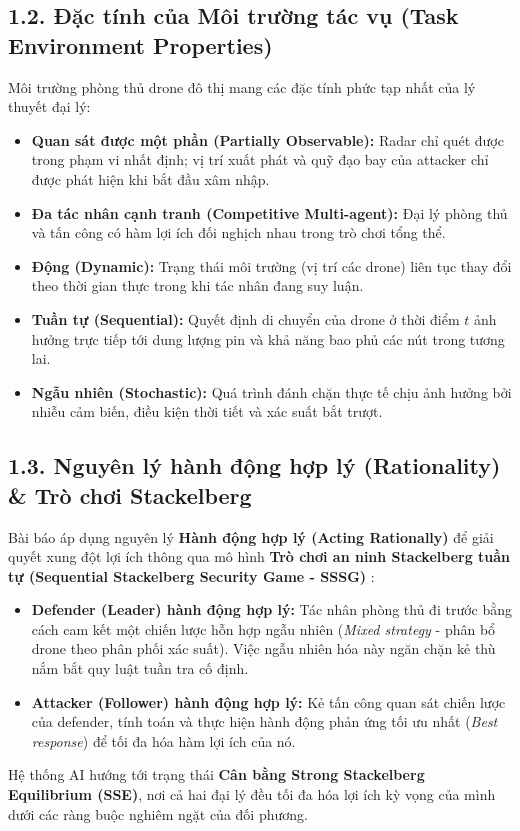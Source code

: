 \documentclass[../main.tex]{subfiles}
\begin{document}
\subsection{1.2. Đặc tính của Môi trường tác vụ (Task Environment Properties)}
Môi trường phòng thủ drone đô thị mang các đặc tính phức tạp nhất của lý thuyết đại lý:
\begin{itemize}
    \item \textbf{Quan sát được một phần (Partially Observable):} Radar chỉ quét được trong phạm vi nhất định; vị trí xuất phát và quỹ đạo bay của attacker chỉ được phát hiện khi bắt đầu xâm nhập.
    \item \textbf{Đa tác nhân cạnh tranh (Competitive Multi-agent):} Đại lý phòng thủ và tấn công có hàm lợi ích đối nghịch nhau trong trò chơi tổng thể.
    \item \textbf{Động (Dynamic):} Trạng thái môi trường (vị trí các drone) liên tục thay đổi theo thời gian thực trong khi tác nhân đang suy luận.
    \item \textbf{Tuần tự (Sequential):} Quyết định di chuyển của drone ở thời điểm $t$ ảnh hưởng trực tiếp tới dung lượng pin và khả năng bao phủ các nút trong tương lai.
    \item \textbf{Ngẫu nhiên (Stochastic):} Quá trình đánh chặn thực tế chịu ảnh hưởng bởi nhiễu cảm biến, điều kiện thời tiết và xác suất bắt trượt.
\end{itemize}

\subsection{1.3. Nguyên lý hành động hợp lý (Rationality) \& Trò chơi Stackelberg}
Bài báo áp dụng nguyên lý \textbf{Hành động hợp lý (Acting Rationally)} để giải quyết xung đột lợi ích thông qua mô hình \textbf{Trò chơi an ninh Stackelberg tuần tự (Sequential Stackelberg Security Game - SSSG)} \cite{mutzari2025defending}:
\begin{itemize}
    \item \textbf{Defender (Leader) hành động hợp lý:} Tác nhân phòng thủ đi trước bằng cách cam kết một chiến lược hỗn hợp ngẫu nhiên (\textit{Mixed strategy} - phân bổ drone theo phân phối xác suất). Việc ngẫu nhiên hóa này ngăn chặn kẻ thù nắm bắt quy luật tuần tra cố định.
    \item \textbf{Attacker (Follower) hành động hợp lý:} Kẻ tấn công quan sát chiến lược của defender, tính toán và thực hiện hành động phản ứng tối ưu nhất (\textit{Best response}) để tối đa hóa hàm lợi ích của nó. 
\end{itemize}
Hệ thống AI hướng tới trạng thái \textbf{Cân bằng Strong Stackelberg Equilibrium (SSE)}, nơi cả hai đại lý đều tối đa hóa lợi ích kỳ vọng của mình dưới các ràng buộc nghiêm ngặt của đối phương.
\end{document}
